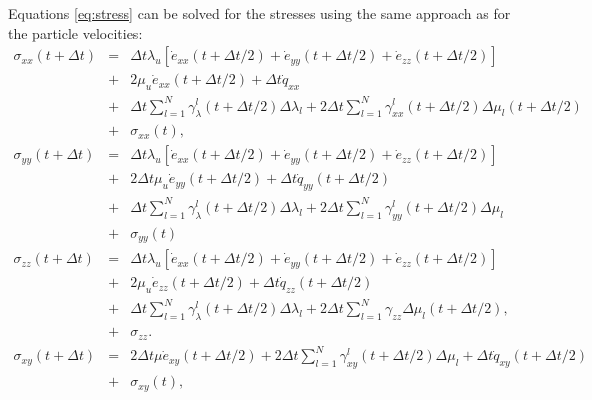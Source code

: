 \documentclass[11pt]{article}
\begin{document}
%
Equations \eqref{eq:stress}   can be solved for the stresses using the same approach as for the particle velocities:
\begin{eqnarray}
  \sigma_{xx}(t+\Delta t) & = & \Delta t\lambda_u \left [\dot{e}_{xx}(t+\Delta t/2) + \dot{e}_{yy}(t+\Delta t/2) + 
                                \dot{e}_{zz}(t+\Delta t/2)\right]\nonumber\\
                           & + & 2\mu_u \dot{e}_{xx}(t+\Delta t/2) +\Delta t\dot{q}_{xx} \nonumber\\
                           & + & \Delta t\sum_{l=1}^N\gamma^l_{\lambda}(t+\Delta t/2)\Delta\lambda_l  
                             +   2\Delta t\sum_{l=1}^N\gamma^l_{xx}(t+\Delta t/2)\Delta\mu_l(t+\Delta t/2)\nonumber\\ 
                           & + &\sigma_{xx}(t),\\
  \sigma_{yy}(t+\Delta t) & = & \Delta t\lambda_u \left [\dot{e}_{xx}(t+\Delta t/2) + \dot{e}_{yy}(t+\Delta t/2) + 
                                \dot{e}_{zz}(t+\Delta t/2)\right]\\
                          & + & 2\Delta t \mu_u \dot{e}_{yy}(t+\Delta t/2) +\Delta t \dot{q}_{yy}(t+\Delta t/2) \nonumber\\
                          & + & \Delta t\sum_{l=1}^N\gamma^l_{\lambda}(t+\Delta t/2)\Delta\lambda_l  
                            +   2\Delta t\sum_{l=1}^N\gamma^l_{yy}(t+\Delta t/2)\Delta\mu_l\\
                          & +& \sigma_{yy}(t) \\
  \sigma_{zz}(t+\Delta t) & = & \Delta t\lambda_u \left [\dot{e}_{xx}(t+\Delta t/2) + \dot{e}_{yy}(t+\Delta t/2) 
                               + \dot{e}_{zz}(t+\Delta t/2)\right] \\
                          & + & 2\mu_u \dot{e}_{zz}(t+\Delta t/2) +\Delta t \dot{q}_{zz}(t+\Delta t/2) \nonumber\\
                          & + & \Delta t\sum_{l=1}^N\gamma^l_{\lambda}(t+\Delta t/2)\Delta\lambda_l   
                            +   2\Delta t\sum_{l=1}^N\gamma_{zz}\Delta\mu_l (t+\Delta t/2)\nonumber, \\
                          & + & \sigma_{zz}.\\
  \sigma_{xy}(t+\Delta t) & = & 2\Delta t\mu \dot{e}_{xy}(t+\Delta t/2) + 2\Delta t\sum_{l=1}^N\gamma^l_{xy}(t+\Delta t/2)\Delta\mu_l+
                                \Delta t \dot{q}_{xy}(t+\Delta t/2)\nonumber\\
                          & + & \sigma_{xy}(t)\nonumber,\\

\end{eqnarray}
\end{document}
